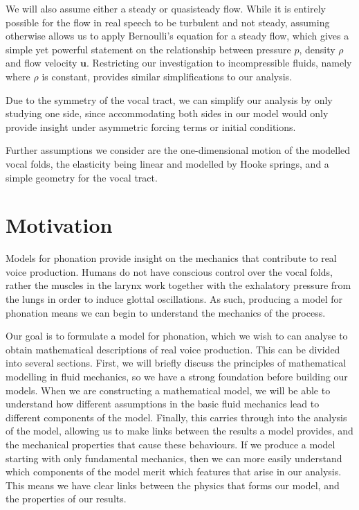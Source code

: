 \documentclass{report}
\begin{document}
We will also assume either a steady or quasisteady flow.
While it is entirely possible for the flow in real speech to be turbulent and not steady,
assuming otherwise allows us to apply Bernoulli's equation for a steady flow,
which gives a simple yet powerful statement on the relationship between pressure $p$, density $\rho$ and flow velocity $\mathbf{u}$.
Restricting our investigation to incompressible fluids, namely where $\rho$ is constant,
provides similar simplifications to our analysis.

Due to the symmetry of the vocal tract,
we can simplify our analysis by only studying one side,
since accommodating both sides in our model would only provide insight under asymmetric forcing terms or initial conditions.

Further assumptions we consider are the one-dimensional motion of the modelled vocal folds,
the elasticity being linear and modelled by Hooke springs,
and a simple geometry for the vocal tract. 

\section{Motivation}

Models for phonation provide insight on the mechanics that contribute to real voice production.
Humans do not have conscious control over the vocal folds,
rather the muscles in the larynx work together with the exhalatory pressure from the lungs in order to induce glottal oscillations.
As such, producing a model for phonation means we can begin to understand the mechanics of the process.

Our goal is to formulate a model for phonation,
which we wish to can analyse to obtain mathematical descriptions of real voice production.
This can be divided into several sections.
First, we will briefly discuss the principles of mathematical modelling in fluid mechanics,
so we have a strong foundation before building our models.
When we are constructing a mathematical model,
we will be able to understand how different assumptions in the basic fluid mechanics lead to different components of the model.
Finally, this carries through into the analysis of the model,
allowing us to make links between the results a model provides,
and the mechanical properties that cause these behaviours.
If we produce a model starting with only fundamental mechanics,
then we can more easily understand which components of the model merit which features that arise in our analysis.
This means we have clear links between the physics that forms our model,
and the properties of our results.
\end{document}
